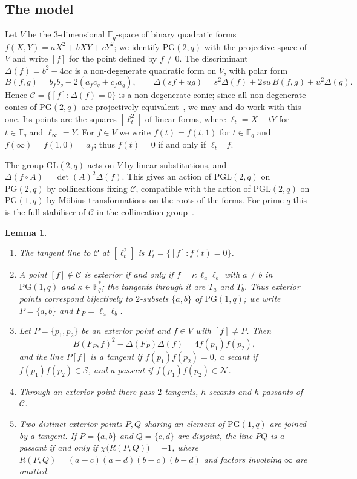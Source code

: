 \documentclass[11pt]{amsart}
\newtheorem{lemma}[theorem]{Lemma}
\theoremstyle{definition}
\theoremstyle{remark}
\numberwithin{equation}{section}
\newcommand{\F}{\mathbb{F}_q}
\newcommand{\Fs}{\mathbb{F}_q^{*}}
\newcommand{\PGone}{\mathrm{PG}(1,q)}
\newcommand{\PGtwo}{\mathrm{PG}(2,q)}
\newcommand{\PGL}{\mathrm{PGL}(2,q)}
\newcommand{\Sq}{\mathcal{S}}
\newcommand{\Ns}{\mathcal{N}}
\newcommand{\Con}{\mathcal{C}}
\begin{document}
\subsection{The model}
Let $V$ be the $3$-dimensional $\F$-space of binary quadratic forms $f(X,Y)=aX^2+bXY+cY^2$; we identify $\PGtwo$ with the
projective space of $V$ and write $[f]$ for the point defined by $f\ne0$. The discriminant $\Delta(f)=b^2-4ac$ is a
non-degenerate quadratic form on $V$, with polar form
\[
B(f,g)=b_fb_g-2(a_fc_g+c_fa_g),\qquad \Delta(sf+ug)=s^2\Delta(f)+2su\,B(f,g)+u^2\Delta(g).
\]
Hence $\Con=\{[f]:\Delta(f)=0\}$ is a non-degenerate conic; since all non-degenerate conics of $\PGtwo$ are projectively
equivalent~\cite{Hirschfeld}, we may and do work with this one. Its points are the squares $[\ell_t^2]$ of linear forms, where
$\ell_t=X-tY$ for $t\in\F$ and $\ell_\infty=Y$. For $f\in V$ we write $f(t)=f(t,1)$ for $t\in\F$ and $f(\infty)=f(1,0)=a_f$;
thus $f(t)=0$ if and only if $\ell_t\mid f$.

The group $\mathrm{GL}(2,q)$ acts on $V$ by linear substitutions, and $\Delta(f\circ A)=\det(A)^2\Delta(f)$. This gives an action of
$\PGL$ on $\PGtwo$ by collineations fixing $\Con$, compatible with the action of $\PGL$ on $\PGone$ by Möbius transformations on
the roots of the forms. For prime $q$ this is the full stabiliser of $\Con$ in the collineation group~\cite{Hirschfeld}.

\begin{lemma}\label{lem:dict}
\begin{enumerate}
\item[(i)] The tangent line to $\Con$ at $[\ell_t^2]$ is $T_t=\{[f]:f(t)=0\}$.
\item[(ii)] A point $[f]\notin\Con$ is exterior if and only if $f=\kappa\,\ell_a\ell_b$ with $a\ne b$ in $\PGone$ and $\kappa\in\Fs$;
the tangents through it are $T_a$ and $T_b$. Thus exterior points correspond bijectively to $2$-subsets $\{a,b\}$ of $\PGone$;
we write $P=\{a,b\}$ and $F_P=\ell_a\ell_b$.
\item[(iii)] Let $P=\{p_1,p_2\}$ be an exterior point and $f\in V$ with $[f]\ne P$. Then
\begin{equation}\label{eq:pencil}
B(F_P,f)^2-\Delta(F_P)\Delta(f)=4f(p_1)f(p_2),
\end{equation}
and the line $P[f]$ is a tangent if $f(p_1)f(p_2)=0$, a secant if $f(p_1)f(p_2)\in\Sq$, and a passant if $f(p_1)f(p_2)\in\Ns$.
\item[(iv)] Through an exterior point there pass $2$ tangents, $h$ secants and $h$ passants of $\Con$.
\item[(v)] Two distinct exterior points $P,Q$ sharing an element of $\PGone$ are joined by a tangent. If $P=\{a,b\}$ and
$Q=\{c,d\}$ are disjoint, the line $PQ$ is a passant if and only if $\chi\bigl(R(P,Q)\bigr)=-1$, where
$R(P,Q)=(a-c)(a-d)(b-c)(b-d)$ and factors involving $\infty$ are omitted.
\end{enumerate}
\end{lemma}
\end{document}
